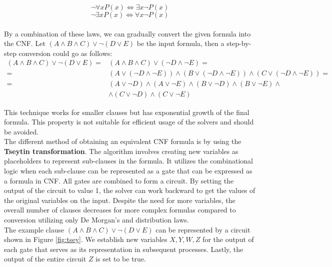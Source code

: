 \begin{equation*}
   \neg \forall x P(x) \iff \exists x \neg P(x) 
\end{equation*}
\begin{equation*}
   \neg \exists x P(x) \iff \forall x \neg P(x) 
\end{equation*}
\\
By a combination of these laws, we can gradually convert the given formula into the CNF. Let $(A \land B \land C) \lor \neg (D \lor E)$ be the input formula, then a step-by-step conversion could go as follows:
\begin{align*}
    (A \land B \land C) \lor \neg (D \lor E) =& (A \land B \land C) \lor (\neg D \land \neg E)=\\
    =& (A \lor (\neg D \land \neg E)) \land (B \lor (\neg D \land \neg E)) \land (C\lor (\neg D \land \neg E)) =\\
    =& (A \lor \neg D) \land (A \lor \neg E) \land (B \lor \neg D) \land (B \lor \neg E) \land {}\\ &\land (C\lor \neg D) \land (C \lor \neg E)
\end{align*}

This technique works for smaller clauses but has exponential growth of the final formula. This property is not suitable for efficient usage of the solvers and should be avoided. \\

The different method of obtaining an equivalent CNF formula is by using the \textbf{Tseytin transformation}. The algorithm involves creating new variables as placeholders to represent sub-clauses in the formula. It utilizes the combinational logic when each sub-clause can be represented as a gate that can be expressed as a formula in CNF. All gates are combined to form a circuit. By setting the output of the circuit to value 1, the solver can work backward to get the values of the original variables on the input. Despite the need for more variables, the overall number of clauses decreases for more complex formulas compared to conversion utilizing only De Morgan's and distribution laws. \\

The example clause $(A \land B \land C) \lor \neg (D \lor E)$ can be represented by a circuit shown in Figure \ref{fig:tsey}. We establish new variables $X, Y, W, Z$ for the output of each gate that serves as its representation in subsequent processes. Lastly, the output of the entire circuit $Z$ is set to be true.


